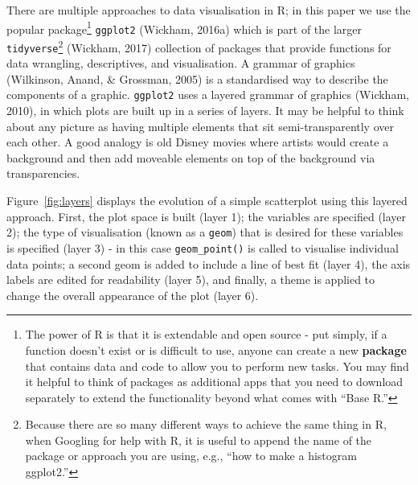 \documentclass[
  english,
  doc,floatsintext]{apa6}
\begin{document}
There are multiple approaches to data visualisation in R; in this paper we use the popular package\footnote{The power of R is that it is extendable and open source - put simply, if a function doesn't exist or is difficult to use, anyone can create a new \textbf{package} that contains data and code to allow you to perform new tasks. You may find it helpful to think of packages as additional apps that you need to download separately to extend the functionality beyond what comes with ``Base R.''} \texttt{ggplot2} (Wickham, 2016a) which is part of the larger \texttt{tidyverse}\footnote{Because there are so many different ways to achieve the same thing in R, when Googling for help with R, it is useful to append the name of the package or approach you are using, e.g., ``how to make a histogram ggplot2.''} (Wickham, 2017) collection of packages that provide functions for data wrangling, descriptives, and visualisation. A grammar of graphics (Wilkinson, Anand, \& Grossman, 2005) is a standardised way to describe the components of a graphic. \texttt{ggplot2} uses a layered grammar of graphics (Wickham, 2010), in which plots are built up in a series of layers. It may be helpful to think about any picture as having multiple elements that sit semi-transparently over each other. A good analogy is old Disney movies where artists would create a background and then add moveable elements on top of the background via transparencies.

Figure~\ref{fig:layers} displays the evolution of a simple scatterplot using this layered approach. First, the plot space is built (layer 1); the variables are specified (layer 2); the type of visualisation (known as a \texttt{geom}) that is desired for these variables is specified (layer 3) - in this case \texttt{geom\_point()} is called to visualise individual data points; a second geom is added to include a line of best fit (layer 4), the axis labels are edited for readability (layer 5), and finally, a theme is applied to change the overall appearance of the plot (layer 6).
\end{document}
